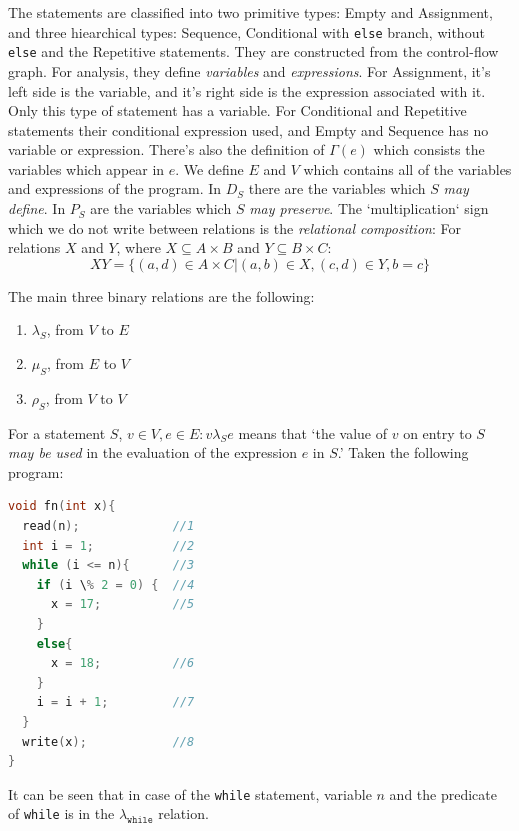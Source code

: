 \documentclass[oneside,12pt,a4paper]{book}
\begin{document}
\FloatBarrier
The statements are classified into two primitive types: Empty and Assignment, and three hiearchical types: Sequence, Conditional with \texttt{else} branch, without \texttt{else} and the Repetitive statements. They are constructed from the control-flow graph. For analysis, they define \textit{variables} and \textit{expressions}. For Assignment, it's left side is the variable, and it's right side is the expression associated with it. Only this type of statement has a variable. For Conditional and Repetitive statements their conditional expression used, and Empty and Sequence has no variable or expression. There's also the definition of $\Gamma(e)$ which consists the variables which appear in $e$. We define $E$ and $V$ which contains all of the variables and expressions of the program. In $D_S$ there are the variables which $S$ \textit{may define}. In $P_S$ are the variables which $S$ \textit{may preserve}. The `multiplication` sign which we do not write between relations is the \textit{relational composition}:
For relations $X$ and $Y$, where $X \subseteq A \times B$ and $Y \subseteq B \times C$:
\begin{equation}
XY = \{(a,d) \in A \times C | (a,b) \in X, (c,d) \in Y, b = c\}
\end{equation}

The main three binary relations are the following:
\begin{enumerate}
\item $\lambda_S$, from $V$ to $E$
\item $\mu_S$, from $E$ to $V$
\item $\rho_S$, from $V$ to $V$
\end{enumerate}

For a statement $S$, $v \in V, e \in E: v \lambda_S e$ means that `the value of $v$ on entry to $S$ \textit{may be used} in the evaluation of the expression $e$ in $S$.' Taken the following program:
\begin{lstlisting}[language=C++]
void fn(int x){
  read(n);             //1
  int i = 1;           //2
  while (i <= n){      //3
    if (i \% 2 = 0) {  //4
      x = 17;          //5
    }
    else{              
      x = 18;          //6
    }
    i = i + 1;         //7
  }
  write(x);            //8
}
\end{lstlisting}

It can be seen that in case of the \texttt{while} statement, variable $n$ and the predicate of \texttt{while} is in the $\lambda_{\texttt{while}}$ relation.
\end{document}
